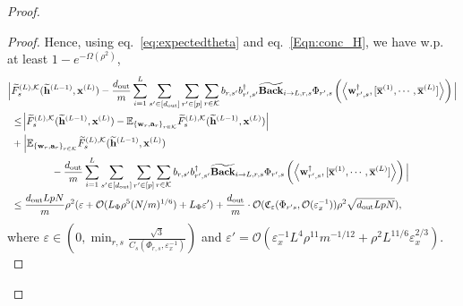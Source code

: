 \begin{claim}
\begin{proof}
\begin{proof}
					Hence, using eq.~\ref{eq:expectedtheta} and eq.~\ref{Eqn:conc_H}, we have w.p. at least $1 - e^{-\Omega(\rho^2)}$,
					\begingroup \allowdisplaybreaks
					\begin{align*}
						\Big|&\widetilde{F}_{s}^{(L), \mathcal{K}}(\widetilde{\mathbf{h}}^{(L-1)}, \mathbf{x}^{(L)}) - \frac{d_{\mathrm{out}} }{m} \sum_{i=1}^{L}  \sum_{s' \in [d_{\mathrm{out}} ]} \sum_{r' \in [p]} \sum_{r \in \mathcal{K}}  b_{r, s'} b_{r', s'}^{\dagger} \widetilde{\mathbf{Back}}_{i \to L, r, s} \Phi_{r', s} \left(\left\langle \mathbf{w}_{r', s}^{\dagger}, [\overline{\mathbf{x}}^{(1)}, \cdots, \overline{\mathbf{x}}^{(L)}]\right\rangle\right)\Big| \\&
						\le \abs{\widetilde{F}_{s}^{(L), \mathcal{K}}(\widetilde{\mathbf{h}}^{(L-1)}, \mathbf{x}^{(L)}) - \mathbb{E}_{\left\{ \mathbf{w}_r, \mathbf{a}_r \right\}_{r \in \mathcal{K}}} \widetilde{F}_{s}^{(L), \mathcal{K}}(\widetilde{\mathbf{h}}^{(L-1)}, \mathbf{x}^{(L)})}  \\&
						+ \Big|\mathbb{E}_{\left\{ \mathbf{w}_r, \mathbf{a}_r \right\}_{r \in \mathcal{K}}} \widetilde{F}_{s}^{(L), \mathcal{K}}(\widetilde{\mathbf{h}}^{(L-1)}, \mathbf{x}^{(L)}) \\& \quad \quad \quad \quad - \frac{d_{\mathrm{out}} }{m} \sum_{i=1}^{L}  \sum_{s' \in [d_{\mathrm{out}} ]} \sum_{r' \in [p]} \sum_{r \in \mathcal{K}}  b_{r, s'} b_{r', s'}^{\dagger} \widetilde{\mathbf{Back}}_{i \to L, r, s} \Phi_{r', s} \left(\left\langle \mathbf{w}_{r', s}^{\dagger}, [\overline{\mathbf{x}}^{(1)}, \cdots, \overline{\mathbf{x}}^{(L)}]\right\rangle\right)\Big| \\&
						\le  \frac{d_{\mathrm{out}} LpN}{m} \rho^2 (\varepsilon + \mathcal{O}(L_{\Phi} \rho^5 (N/m)^{1/6}) + L_{\Phi}\varepsilon') + \frac{d_{\mathrm{out}} }{m} \cdot \mathcal{O}(\mathfrak{C}_{\varepsilon}(\Phi_{r' s}, \mathcal{O}(\varepsilon_x^{-1})) \rho^2 \sqrt{d_{\mathrm{out}} LpN}),
					\end{align*}
					where $\varepsilon \in (0, \min_{r, s} \frac{\sqrt{3}}{C_s(\Phi_{r, s}, \varepsilon_x^{-1})})$ and  $\varepsilon' =  \mathcal{O}(\varepsilon_x^{-1} L^4 \rho^{11} m^{-1/12} + \rho^2 L^{11/6} \varepsilon_x^{2/3}).$ 
					\endgroup
					
				\end{proof}
				

\end{proof}
\end{claim}
